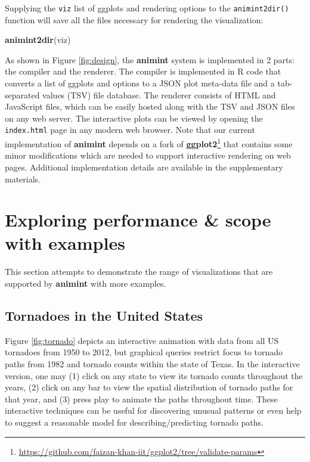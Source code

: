 \documentclass[12pt,]{article}
\newenvironment{Shaded}{\begin{snugshade}}{\end{snugshade}}
\newcommand{\KeywordTok}[1]{\textcolor[rgb]{0.13,0.29,0.53}{\textbf{#1}}}
\newcommand{\NormalTok}[1]{#1}
\let\rmarkdownfootnote\footnote%
\def\footnote{\protect\rmarkdownfootnote}
\theoremstyle{definition}
\theoremstyle{definition}
\theoremstyle{definition}
\theoremstyle{remark}
\begin{document}
Supplying the \texttt{viz} list of ggplots and rendering options to the
\texttt{animint2dir()} function will save all the files necessary for
rendering the visualization:

\begin{Shaded}
\begin{Highlighting}[]
\KeywordTok{animint2dir}\NormalTok{(viz)}
\end{Highlighting}
\end{Shaded}

As shown in Figure \ref{fig:design}, the \textbf{animint} system is
implemented in 2 parts: the compiler and the renderer. The compiler is
implemented in R code that converts a list of ggplots and options to a
JSON plot meta-data file and a tab-separated values (TSV) file database.
The renderer consists of HTML and JavaScript files, which can be easily
hosted along with the TSV and JSON files on any web server. The
interactive plots can be viewed by opening the \texttt{index.html} page
in any modern web browser. Note that our current implementation of
\textbf{animint} depends on a fork of
\textbf{ggplot2}\footnote{\url{https://github.com/faizan-khan-iit/ggplot2/tree/validate-params}}
that contains some minor modifications which are needed to support
interactive rendering on web pages. Additional implementation details
are available in the supplementary materials.

\hypertarget{performance}{%
\section{Exploring performance \& scope with
examples}\label{performance}}

This section attempts to demonstrate the range of visualizations that
are supported by \textbf{animint} with more examples.

\hypertarget{tornadoes-in-the-united-states}{%
\subsection{Tornadoes in the United
States}\label{tornadoes-in-the-united-states}}

Figure \ref{fig:tornado} depicts an interactive animation with data from
all US tornadoes from 1950 to 2012, but graphical queries restrict focus
to tornado paths from 1982 and tornado counts within the state of Texas.
In the interactive version, one may (1) click on any state to view its
tornado counts throughout the years, (2) click on any bar to view the
spatial distribution of tornado paths for that year, and (3) press play
to animate the paths throughout time. These interactive techniques can
be useful for discovering unusual patterns or even help to suggest a
reasonable model for describing/predicting tornado paths.
\end{document}
